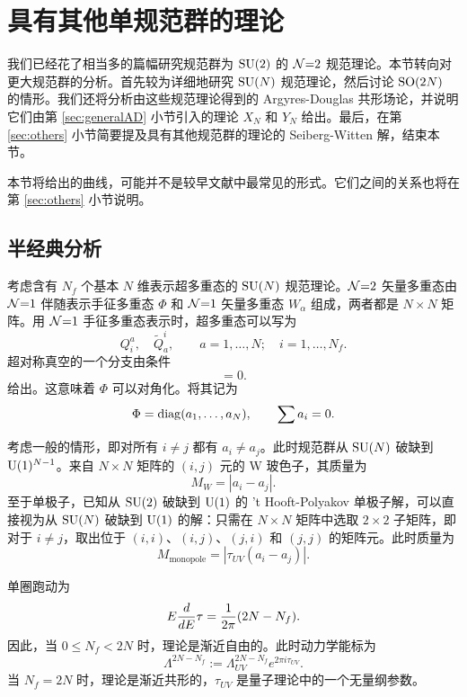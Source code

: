 \section{具有其他单规范群的理论}\label{sec:higherrank}
我们已经花了相当多的篇幅研究规范群为 $\mathop{\mathrm{SU}}(2)$ 的 $\mathcal{N}{=}2$ 规范理论。本节转向对更大规范群的分析。首先较为详细地研究 $\mathop{\mathrm{SU}}(N)$ 规范理论，然后讨论 $\mathop{\mathrm{SO}}(2N)$ 的情形。我们还将分析由这些规范理论得到的 Argyres-Douglas 共形场论，并说明它们由第 \ref{sec:generalAD} 小节引入的理论 $X_N$ 和 $Y_N$ 给出。最后，在第 \ref{sec:others} 小节简要提及具有其他规范群的理论的 Seiberg-Witten 解，结束本节。

本节将给出的曲线，可能并不是较早文献中最常见的形式。它们之间的关系也将在第 \ref{sec:others} 小节说明。

\subsection{半经典分析}
考虑含有 $N_f$ 个基本 $N$ 维表示超多重态的 $\mathop{\mathrm{SU}}(N)$ 规范理论。$\mathcal{N}{=}2$ 矢量多重态由 $\mathcal{N}{=}1$ 伴随表示手征多重态 $\Phi$ 和 $\mathcal{N}{=}1$ 矢量多重态 $W_\alpha$ 组成，两者都是 $N\times N$ 矩阵。用 $\mathcal{N}{=}1$ 手征多重态表示时，超多重态可以写为
\begin{equation}
Q_i^a,\quad\tilde Q^i_a,\qquad a=1,\ldots,N;\quad i=1,\ldots,N_f.
\end{equation}
超对称真空的一个分支由条件
\begin{equation}
[\Phi,\Phi^\dagger]=0.
\end{equation}
给出。这意味着 $\Phi$ 可以对角化。将其记为
\begin{equation}
\Phi=\mathop{\mathrm{diag}}(a_1,\ldots,a_N),\qquad\sum a_i=0.
\end{equation}

考虑一般的情形，即对所有 $i\neq j$ 都有 $a_i\neq a_j$。此时规范群从 $\mathop{\mathrm{SU}}(N)$ 破缺到 ${\mathrm{U}}(1)^{N-1}$。来自 $N\times N$ 矩阵的 $(i,j)$ 元的 W 玻色子，其质量为
\begin{equation}
M_W=|a_i-a_j|.
\end{equation}
至于单极子，已知从 $\mathop{\mathrm{SU}}(2)$ 破缺到 ${\mathrm{U}}(1)$ 的 't Hooft-Polyakov 单极子解，可以直接视为从 $\mathop{\mathrm{SU}}(N)$ 破缺到 ${\mathrm{U}}(1)$ 的解：只需在 $N\times N$ 矩阵中选取 $2\times2$ 子矩阵，即对于 $i\neq j$，取出位于 $(i,i)$、$(i,j)$、$(j,i)$ 和 $(j,j)$ 的矩阵元。此时质量为
\begin{equation}
M_\text{monopole}=|\tau_{UV}(a_i-a_j)|.
\end{equation}

单圈跑动为
\begin{equation}
E\frac d{dE}\tau=\frac1{2\pi}(2N-N_f).
\end{equation}
因此，当 $0\le N_f<2N$ 时，理论是渐近自由的。此时动力学能标为
\begin{equation}
\Lambda^{2N-N_f}:=\Lambda_{UV}^{2N-N_f}e^{2\pi i\tau_{UV}}.
\end{equation}
当 $N_f=2N$ 时，理论是渐近共形的，$\tau_{UV}$ 是量子理论中的一个无量纲参数。

